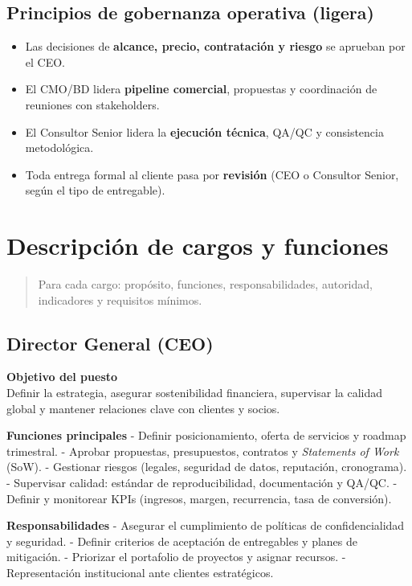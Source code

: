 \documentclass[
  spanish,
]{article}
\begin{document}
\subsection{Principios de gobernanza operativa
(ligera)}\label{principios-de-gobernanza-operativa-ligera}

\begin{itemize}
\tightlist
\item
  Las decisiones de \textbf{alcance, precio, contratación y riesgo} se
  aprueban por el CEO.
\item
  El CMO/BD lidera \textbf{pipeline comercial}, propuestas y
  coordinación de reuniones con stakeholders.
\item
  El Consultor Senior lidera la \textbf{ejecución técnica}, QA/QC y
  consistencia metodológica.
\item
  Toda entrega formal al cliente pasa por \textbf{revisión} (CEO o
  Consultor Senior, según el tipo de entregable).
\end{itemize}

\section{Descripción de cargos y
funciones}\label{descripciuxf3n-de-cargos-y-funciones}

\begin{quote}
Para cada cargo: propósito, funciones, responsabilidades, autoridad,
indicadores y requisitos mínimos.
\end{quote}

\subsection{Director General (CEO)}\label{director-general-ceo}

\textbf{Objetivo del puesto}\\
Definir la estrategia, asegurar sostenibilidad financiera, supervisar la
calidad global y mantener relaciones clave con clientes y socios.

\textbf{Funciones principales} - Definir posicionamiento, oferta de
servicios y roadmap trimestral. - Aprobar propuestas, presupuestos,
contratos y \emph{Statements of Work} (SoW). - Gestionar riesgos
(legales, seguridad de datos, reputación, cronograma). - Supervisar
calidad: estándar de reproducibilidad, documentación y QA/QC. - Definir
y monitorear KPIs (ingresos, margen, recurrencia, tasa de conversión).

\textbf{Responsabilidades} - Asegurar el cumplimiento de políticas de
confidencialidad y seguridad. - Definir criterios de aceptación de
entregables y planes de mitigación. - Priorizar el portafolio de
proyectos y asignar recursos. - Representación institucional ante
clientes estratégicos.
\end{document}
